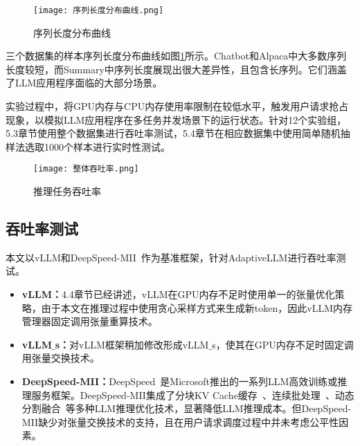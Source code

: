 \begin{figure}[!htbp]
  \centering
  \texttt{[image: 序列长度分布曲线.png]}
  \caption{序列长度分布曲线}
  \label{Fig:序列长度分布曲线}
\end{figure}

三个数据集的样本序列长度分布曲线如图\ref{Fig:序列长度分布曲线}所示。Chatbot和Alpaca中大多数序列长度较短，而Summary中序列长度展现出很大差异性，且包含长序列。它们涵盖了LLM应用程序面临的大部分场景。

实验过程中，将GPU内存与CPU内存使用率限制在较低水平，触发用户请求抢占现象，以模拟LLM应用程序在多任务并发场景下的运行状态。针对12个实验组，5.3章节使用整个数据集进行吞吐率测试，5.4章节在相应数据集中使用简单随机抽样法选取1000个样本进行实时性测试。

\begin{figure*}[!htbp]
  \centering
  \texttt{[image: 整体吞吐率.png]}
  \caption{推理任务吞吐率}
  \label{Fig:推理任务吞吐率}
\end{figure*}

\subsection{吞吐率测试}

本文以vLLM和DeepSpeed-MII~\cite{DeepSpeed-MII}作为基准框架，针对AdaptiveLLM进行吞吐率测试。

\begin{itemize}

  \item \textbf{vLLM：}4.4章节已经讲述，vLLM在GPU内存不足时使用单一的张量优化策略，由于本文在推理过程中使用贪心采样方式来生成新token，因此vLLM内存管理器固定调用张量重算技术。
  
  \item \textbf{vLLM$\_$s：}对vLLM框架稍加修改形成vLLM$\_$s，使其在GPU内存不足时固定调用张量交换技术。
  
  \item \textbf{DeepSpeed-MII：}DeepSpeed~\cite{DeepSpeed}是Microsoft推出的一系列LLM高效训练或推理服务框架。DeepSpeed-MII集成了分块KV Cache缓存~\cite{vLLM}、连续批处理~\cite{Continuous-Batching}、动态分割融合~\cite{DeepSpeed-FastGen}等多种LLM推理优化技术，显著降低LLM推理成本。但DeepSpeed-MII缺少对张量交换技术的支持，且在用户请求调度过程中并未考虑公平性因素。
  
\end{itemize}

